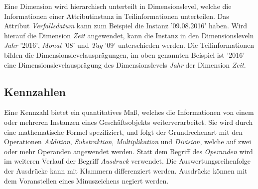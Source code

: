 \documentclass[
  language=german, %
  type=bachelor%
]{isthesis}
\begin{document}
\begin{content}
  \begin{figure}[caption={Teilsprache---Dimension}, label={geschaeftsobjekt}]
    \resizebox{350px}{!}{}
  \end{figure}
  
  Eine Dimension wird hierarchisch unterteilt in Dimensionslevel, welche die
  Informationen einer Attributinstanz in Teilinformationen unterteilen. Das
  Attribut \textit{Verfallsdatum} kann zum Beispiel die Instanz '09.08.2016'
  haben. Wird hierauf die Dimension \textit{Zeit} angewendet, kann die Instanz
  in den Dimensionsleveln \textit{Jahr} '2016', \textit{Monat} '08' und
  \textit{Tag} '09' unterschieden werden. Die Teilinformationen bilden die
  Dimensionslevelausprägungen, im oben genannten Beispiel ist '2016' eine
  Dimensionslevelausprägung des Dimensionslevels \textit{Jahr} der Dimension
  \textit{Zeit}.
  
  \subsection{Kennzahlen}

  \begin{figure}[caption={Teilsprache---Kennzahl}, label={kennzahl}]
    \resizebox{250px}{!}{}
  \end{figure}

	Eine Kennzahl bietet ein quantitatives  Maß,
	welches die Informationen von einem oder mehreren Instanzen eines
	Geschäftsobjekts weiterverarbeitet. Sie wird durch eine mathematische Formel
	spezifiziert, und folgt der Grundrechenart mit den Operationen
	\textit{Addition}, \textit{Substraktion}, \textit{Multiplikation} und
	\textit{Division}, welche auf zwei oder mehr Operanden angewendet werden.
	Statt dem Begriff des \textit{Operanden} wird im weiteren Verlauf der Begriff
	\textit{Ausdruck} verwendet.  Die Auswertungsreihenfolge der Ausdrücke kann
	mit Klammern differenziert werden. Ausdrücke können mit dem Voranstellen
	eines Minuszeichens negiert werden.


\end{content}
\end{document}
